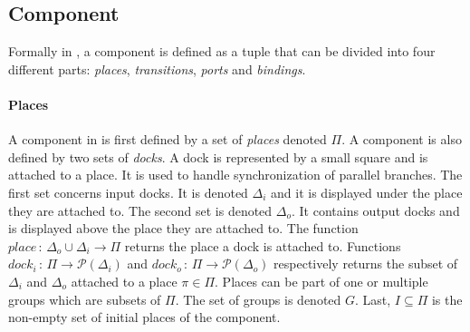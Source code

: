 \subsection{Component}

Formally in \mad, a component is defined as a tuple that can be divided
into four different parts: \emph{places}, \emph{transitions}, \emph{ports} and
\emph{bindings}.

\paragraph{Places}{

A component in \mad is first defined by a set of \emph{places} denoted
$\Pi$. A component is also defined by two sets of
\emph{docks}. A dock is represented by a small square and is attached to a
place. It is used to handle synchronization of parallel branches. The
first set concerns input docks. It is denoted $\Delta_{i}$ and it is
displayed under the place they are attached to. The second set is
denoted $\Delta_{o}$. It contains output docks and is displayed above
the place they are attached to.
The function $place\,:\,\Delta_{o}\cup\Delta_{i}\rightarrow\Pi$
returns the place a dock is attached to. Functions
$dock_i\,:\,\Pi\rightarrow \mathcal{P}(\Delta_{i})$ and
$dock_o\,:\,\Pi\rightarrow \mathcal{P}(\Delta_{o})$ respectively
returns the subset of $\Delta_i$ and $\Delta_o$ attached to a place
$\pi\in\Pi$. Places can be part of one or multiple groups which are
subsets of $\Pi$. The set of groups is denoted $G$. Last, $I \subseteq \Pi$ is the
non-empty set of initial places of the component.

}

